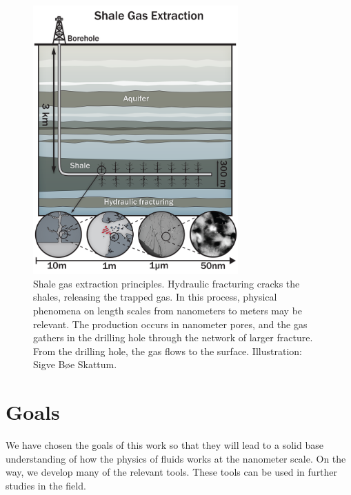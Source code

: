 \begin{figure}[H]
\begin{center}
\includegraphics[width=0.7\textwidth, trim=0cm 0cm 0cm 0cm, clip]{figures/shale_gas_extraction.png}
\end{center}
\caption{Shale gas extraction principles. Hydraulic fracturing cracks the shales, releasing the trapped gas. In this process, physical phenomena on length scales from nanometers to meters may be relevant. The production occurs in nanometer pores, and the gas gathers in the drilling hole through the network of larger fracture. From the drilling hole, the gas flows to the surface. Illustration: Sigve B{\o}e Skattum.}
\label{fig:shale_gas_extraction}
\end{figure}

\section{Goals}
\label{sec:goals}
We have chosen the goals of this work so that they will lead to a solid base understanding of how the physics of fluids works at the nanometer scale. On the way, we develop many of the relevant tools. These tools can be used in further studies in the field. 

